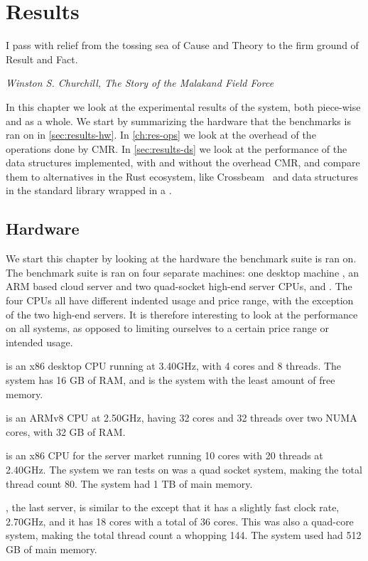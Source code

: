 \chapter{Results\label{ch:results}}

\epigraph{I pass with relief from the tossing sea of Cause and Theory to the firm ground of Result
and Fact.} {\textit{Winston S. Churchill, The Story of the Malakand Field Force}}

In this chapter we look at the experimental results of the system, both piece-wise and as a whole.
We start by summarizing the hardware that the benchmarks is ran on in \cref{sec:results-hw}. In
\cref{ch:res-ops} we look at the overhead of the operations done by CMR\@. In \cref{sec:results-ds} we
look at the performance of the data structures implemented, with and without the overhead CMR, and
compare them to alternatives in the Rust ecosystem, like Crossbeam~\cite{crossbeam} and data
structures in the standard library wrapped in a .

\clearpage

\section{Hardware\label{sec:results-hw}}

We start this chapter by looking at the hardware the benchmark suite is ran on.  The benchmark
suite is ran on four separate machines: one desktop machine \gribb{}, an ARM based cloud server
\scaleway{} and two quad-socket high-end server CPUs, \mitserver{} and \daslab{}.  The four CPUs
all have different indented usage and price range, with the exception of the two high-end servers.
It is therefore interesting to look at the performance on all systems, as opposed to limiting
ourselves to a certain price range or intended usage.

\gribb{} is an x86 desktop CPU running at 3.40GHz, with 4 cores and 8 threads. The system has 16 GB of
RAM, and is the system with the least amount of free memory.

\scaleway{} is an ARMv8 CPU at 2.50GHz, having 32 cores and 32 threads over two NUMA cores, with 32
GB of RAM\@.

\mitserver{} is an x86 CPU for the server market running 10 cores with 20 threads at 2.40GHz. The
system we ran tests on was a quad socket system, making the total thread count 80. The system had 1
TB of main memory.

\daslab{}, the last server, is similar to the \mitserver{} except that it has a slightly fast clock
rate, 2.70GHz, and it has 18 cores with a total of 36 cores. This was also a quad-core system,
making the total thread count a whopping 144. The system used had 512 GB of main memory.


